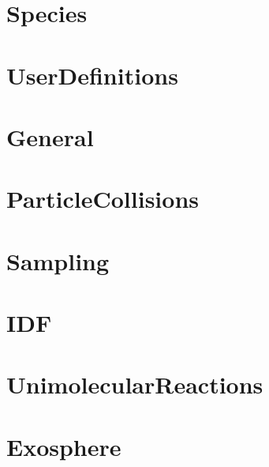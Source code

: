 \section {Species}


\section{UserDefinitions}


\section{General}


\section{ParticleCollisions}

\section{Sampling}


\section{IDF}


\section{UnimolecularReactions}


\section{Exosphere}








